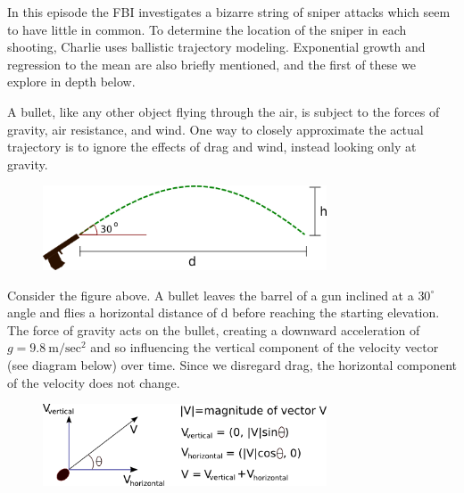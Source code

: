 \newpage
{}
{}
\setcounter{activity}{0}


In this episode the FBI investigates a bizarre string of sniper attacks which seem to have little in common. To determine the location of the sniper in each shooting, Charlie uses ballistic trajectory modeling. Exponential growth and regression to the mean are also briefly mentioned, and the first of these we explore in depth below.




A bullet, like any other object flying through the air, is subject to the forces of gravity, air resistance, and wind. One way to closely approximate the actual trajectory is to ignore the effects of drag and wind, instead looking only at gravity.

	\begin{figure}[H] 
	\centering
	\includegraphics[width=0.75\textwidth]{../sections/seasons/season1/109/images/109(1).png} 
	\end{figure}
	
Consider the figure above. A bullet leaves the barrel of a gun inclined at a $30^\circ$ angle and flies a horizontal distance of d before reaching the starting elevation. The force of gravity acts on the bullet, creating a downward acceleration of $g= 9.8~\text{m}/\text{sec}^2$ and so influencing the vertical component of the velocity vector (see diagram below) over time. Since we disregard drag, the horizontal component of the velocity does not change.

	\begin{figure}[H] 
	\centering
	\includegraphics[width=0.75\textwidth]{../sections/seasons/season1/109/images/109(2).png} 
	\end{figure}


